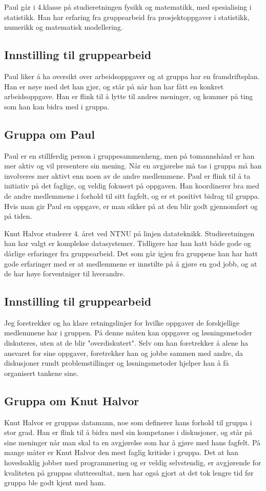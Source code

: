 Paul går i 4.klasse på studieretningen fysikk og matematikk, med spesialising i statistikk. Han har erfaring fra gruppearbeid fra prosjektoppgaver i statistikk, numerikk og matematisk modellering.

\subsection*{Innstilling til gruppearbeid}
Paul liker å ha oversikt over arbeidsoppgaver og at gruppa har en framdriftsplan. Han er nøye med det han gjør, og står på når han har fått en konkret arbeidsoppgave. Han er flink til å lytte til andres meninger, og kommer på ting som han kan bidra med i gruppa.

\subsection*{Gruppa om Paul}
Paul er en stillferdig person i gruppesammenheng, men på tomannshånd er han mer
aktiv og vil presentere sin mening. Når en avgjørelse må tas i gruppa må han
involveres mer aktivt enn noen av de andre medlemmene. Paul er flink til å ta 
initiativ på det faglige, og veldig fokusert på oppgaven. Han koordinerer bra 
med de andre medlemmene i forhold til sitt fagfelt, og er et positivt bidrag til
gruppa. Hvis man gir Paul en oppgave, er man sikker på at den blir godt
gjennomført og på tiden.

Knut Halvor studerer 4. året ved NTNU på linjen datateknikk. Studieretningen han 
har valgt er komplekse datasystemer. Tidligere har han hatt både gode og dårlige
erfaringer fra gruppearbeid. Det som går igjen fra gruppene han har hatt gode
erfaringer med er at medlemmene er innstilte på å gjøre en god jobb, og at de
har høye forventniger til hverandre.

\subsection*{Innstilling til gruppearbeid}
Jeg foretrekker og ha klare retningslinjer for hvilke oppgaver de forskjellige 
medlemmene har i gruppen. På denne måten kan oppgaver og løsningsmetoder diskuteres,
uten at de blir "overdiskutert". Selv om han foretrekker å alene ha ansvaret for sine oppgaver,
foretrekker han og jobbe sammen med andre, da diskusjoner rundt problemstillinger og
løsningsmetoder hjelper han å få organisert tankene sine.

\subsection*{Gruppa om Knut Halvor}
Knut Halvor er gruppas datamann, noe som definerer hans forhold til gruppa i
stor grad. Han er flink til å bidra med sin kompetanse i diskusjoner, og står på
sine meninger når man skal ta en avgjørelse som har å gjøre med hans fagfelt. På
mange måter er Knut Halvor den mest faglig kritiske i gruppa. Det at han hovedsaklig
jobber med programmering og er veldig selvstendig, er avgjørende for kvaliteten på 
gruppas sluttresultat, men har også gjort at det tok lengre tid før gruppa ble godt 
kjent med ham.

